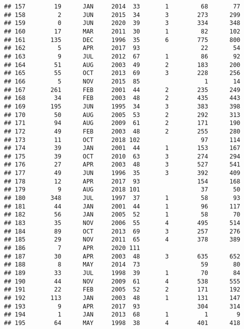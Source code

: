 \documentclass[
  english,
  man]{apa6}
\begin{document}
\begin{verbatim}
## 157        19      JAN     2014  33       1         68       77
## 158         2      JUN     2015  34       3        273      299
## 159         0      JUN     2020  39       3        334      348
## 160        17      MAR     2011  30       1         82      102
## 161       135      DEC     1996  35       6        775      800
## 162         5      APR     2017  93                 22       54
## 163         9      JUL     2012  67       1         86       92
## 164        51      AUG     2003  49       2        183      200
## 165        55      OCT     2013  69       3        228      256
## 166         5      NOV     2015  85                  1       14
## 167       261      FEB     2001  44       2        235      249
## 168        34      FEB     2003  48       2        435      443
## 169       195      JUN     1995  34       3        383      398
## 170        50      AUG     2005  53       2        292      313
## 171        94      AUG     2009  61       2        171      190
## 172        49      FEB     2003  48       2        255      280
## 173        11      OCT     2018 102                 97      114
## 174        39      JAN     2001  44       1        153      167
## 175        39      OCT     2010  63       3        274      294
## 176        27      APR     2003  48       3        527      541
## 177        49      JUN     1996  35       3        392      409
## 178        12      APR     2017  93                154      168
## 179         9      AUG     2018 101                 37       50
## 180       348      JUL     1997  37       1         58       93
## 181        44      JAN     2001  44       1         96      117
## 182        56      JAN     2005  52       1         58       70
## 183        35      NOV     2006  55       4        495      514
## 184        89      OCT     2013  69       3        257      276
## 185        29      NOV     2011  65       4        378      389
## 186         7      APR     2020 111                            
## 187        30      APR     2003  48       3        635      652
## 188         8      MAY     2014  73                 59       80
## 189        33      JUL     1998  39       1         70       84
## 190        44      NOV     2009  61       4        538      555
## 191        22      FEB     2005  52       2        171      192
## 192       113      JAN     2003  48       1        131      147
## 193         9      APR     2017  93                304      314
## 194         1      JAN     2013  68       1          1        9
## 195        64      MAY     1998  38       4        401      418

\end{verbatim}
\end{document}
